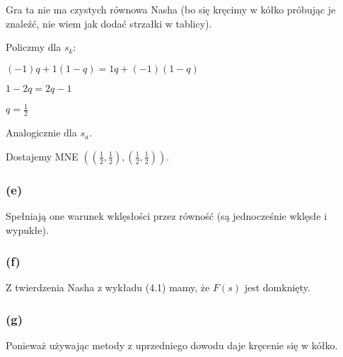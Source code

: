 \documentclass{article}
\begin{document}
Gra ta nie ma czystych równowa Nasha (bo się kręcimy w kółko próbując je znaleźć, nie wiem jak dodać strzałki w tablicy).

Policzmy dla $s_k$:

$(-1)q + 1(1-q) = 1q + (-1)(1-q)$

$1-2q = 2q-1$

$q=\frac{1}{2}$

Analogicznie dla $s_a$.

Dostajemy MNE $((\frac{1}{2}, \frac{1}{2}),(\frac{1}{2}, \frac{1}{2}))$.

\subsubsection*{(e)}

Spełniają one warunek wklęsłości przez równość (są jednocześnie wklęsłe i wypukłe).

\subsubsection*{(f)}

Z twierdzenia Nasha z wykładu (4.1) mamy, że $F(s)$ jest domknięty.

\subsubsection*{(g)}

Ponieważ używając metody z uprzedniego dowodu daje kręcenie się w kółko.
\end{document}
